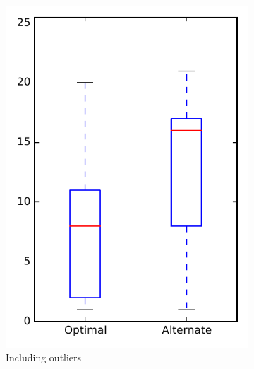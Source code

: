 
\begin{figure}
    \centering
    \begin{subfigure}{.4\textwidth}
        \centering
        \includegraphics[height=0.4\textheight]{figures/combo/dit_rq2_pig}
        \caption{Including outliers}\label{fig:combo:dit:rq2:pig_outlier}
    \end{subfigure}%
    \begin{subfigure}{.4\textwidth}
        \centering

\end{subfigure}
\end{figure}
